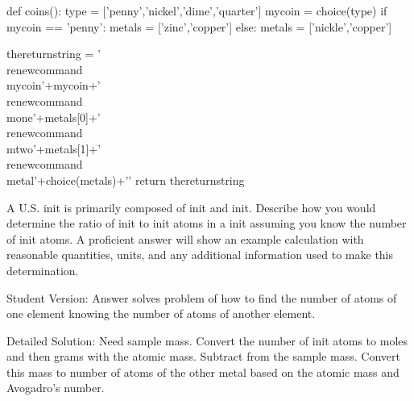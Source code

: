 

\begin{pycode}

def coins():
	type = ['penny','nickel','dime','quarter']
	mycoin = choice(type)
	if mycoin == 'penny':
		metals = ['zinc','copper']
	else:
		metals = ['nickle','copper']
	
	thereturnstring = '\\renewcommand{\\mycoin}{'+mycoin+'} \
	\\renewcommand{\\mone}{'+metals[0]+'} \
	\\renewcommand{\\mtwo}{'+metals[1]+'} \
	\\renewcommand{\\metal}{'+choice(metals)+'}'
	return thereturnstring

\end{pycode}

\providecommand{\mycoin}{init}
\providecommand{\mone}{init}
\providecommand{\mtwo}{init}
\providecommand{\metal}{init} 


A U.S. \mycoin{} is primarily composed of \mone{} and \mtwo{}. Describe how you would determine the ratio of \mone{} to \mtwo{} atoms in a \mycoin{} assuming you know the number of \mone{} atoms. A proficient answer will show an example calculation with reasonable quantities, units, and any additional information used to make this determination.

\begin{solution}

Student Version: Answer solves problem of how to find the number of atoms of one element knowing the number of atoms of another element. 

\ifgradingnotes
Detailed Solution: Need sample mass. Convert the number of \metal{} atoms to moles and then grams with the atomic mass. Subtract from the sample mass. Convert this mass to number of atoms of the other metal based on the atomic mass and Avogadro's number. 
\fi
\end{solution}


